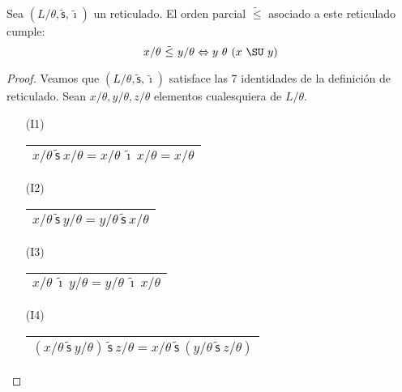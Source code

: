   \begin{lemma}
    \PN Sea $(L/\theta, \mathsf{\tilde{s}}, \mathsf{\tilde{\imath}})$ un reticulado. El orden parcial $\tilde{\leq}$
    asociado a este reticulado cumple:
    \[
      x/\theta \ \tilde{\leq} \ y/\theta \Leftrightarrow y \ \theta \ (x \ \SU \ y)
    \]
  \end{lemma}
  \begin{proof}
    \PN Veamos que $(L/\theta, \mathsf{\tilde{s}}, \mathsf{\tilde{\imath}})$ satisface las 7 identidades de la
    definición de reticulado. Sean $x/\theta, y/\theta, z/\theta$ elementos cualesquiera de $L/\theta$.
    \begin{multicols}{2}
      \begin{enumerate}
        \item[(I1)] \begin{tabular}{|c|} \hline $x/\theta \ \mathsf{\tilde{s}} \ x/\theta = x/\theta \
          \mathsf{\tilde{\imath}} \ x/\theta = x/\theta$ \\\hline \end{tabular}
        \item[(I2)] \begin{tabular}{|c|} \hline $x/\theta \ \mathsf{\tilde{s}} \ y/\theta = y/\theta \
          \mathsf{\tilde{s}} \ x/\theta$ \\\hline \end{tabular}
        \item[(I3)] \begin{tabular}{|c|} \hline $x/\theta \ \mathsf{\tilde{\imath}} \ y/\theta = y/\theta \
          \mathsf{\tilde{\imath}} \ x/\theta$ \\\hline \end{tabular}
        \item[(I4)] \begin{tabular}{|c|} \hline $(x/\theta \ \mathsf{\tilde{s}} \ y/\theta) \ \mathsf{\tilde{s}} \
          z/\theta = x/\theta \ \mathsf{\tilde{s}} \ (y/\theta \ \mathsf{\tilde{s}} \ z/\theta)$ \\\hline \end{tabular}


\end{enumerate}
\end{multicols}
\end{proof}
